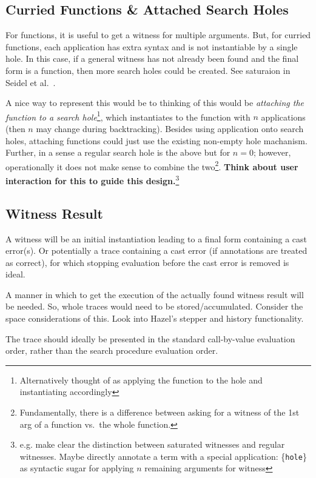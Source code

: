 \subsection{Curried Functions \& Attached Search Holes}
For functions, it is useful to get a witness for multiple arguments. But, for curried functions, each application has extra syntax and is not instantiable by a single hole. In this case, if a general witness has not already been found and the final form is a function, then more search holes could be created. See saturaion in Seidel et al.\ \cite{SearchProc}.\par 
A nice way to represent this would be to thinking of this would be \textit{attaching the function to a search hole}\footnote{Alternatively thought of as applying the function to the hole and instantiating accordingly}, which instantiates to the function with $n$ applications (then $n$ may change during backtracking). Besides using application onto search holes, attaching functions could just use the existing non-empty hole machanism. Further, in a sense a regular search hole is the above but for $n=0$; however, operationally it does not make sense to combine the two\footnote{Fundamentally, there is a difference between asking for a witness of the 1st arg of a function vs.\ the whole function.}. \textbf{Think about user interaction for this to guide this design.}\footnote{e.g. make clear the distinction between saturated witnesses and regular witnesses. Maybe directly annotate a term with a special application: \{\texttt{hole}\} as syntactic sugar for applying $n$ remaining arguments for witness}

\subsection{Witness Result}
A witness will be an initial instantiation leading to a  final form containing a cast error(s). Or potentially a trace containing a cast error (if annotations are treated as correct), for which stopping evaluation before the cast error is removed is ideal. 
\par
A manner in which to get the execution of the actually found witness result will be needed. So, whole traces would need to be stored/accumulated. Consider the space considerations of this. Look into Hazel's stepper and history functionality.\par 
The trace should ideally be presented in the standard call-by-value evaluation order, rather than the search procedure evaluation order.

